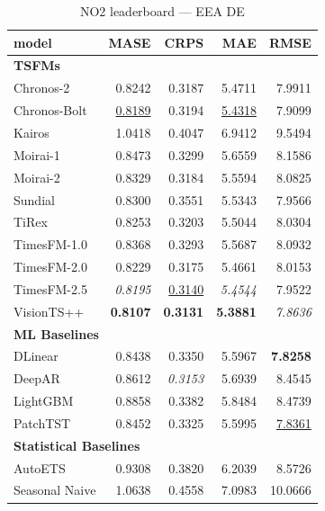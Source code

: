 \begin{table}[H]
\caption{NO2 leaderboard --- EEA DE}
\centering
\begin{small}
\begin{tabular}{lrrrr}
\toprule
model & MASE & CRPS & MAE & RMSE \\
\midrule
\multicolumn{5}{l}{\textbf{TSFMs}} \\
Chronos-2 & 0.8242 & 0.3187 & 5.4711 & 7.9911 \\
Chronos-Bolt & \underline{0.8189} & 0.3194 & \underline{5.4318} & 7.9099 \\
Kairos & 1.0418 & 0.4047 & 6.9412 & 9.5494 \\
Moirai-1 & 0.8473 & 0.3299 & 5.6559 & 8.1586 \\
Moirai-2 & 0.8329 & 0.3184 & 5.5594 & 8.0825 \\
Sundial & 0.8300 & 0.3551 & 5.5343 & 7.9566 \\
TiRex & 0.8253 & 0.3203 & 5.5044 & 8.0304 \\
TimesFM-1.0 & 0.8368 & 0.3293 & 5.5687 & 8.0932 \\
TimesFM-2.0 & 0.8229 & 0.3175 & 5.4661 & 8.0153 \\
TimesFM-2.5 & \textit{0.8195} & \underline{0.3140} & \textit{5.4544} & 7.9522 \\
VisionTS++ & \textbf{0.8107} & \textbf{0.3131} & \textbf{5.3881} & \textit{7.8636} \\
\midrule
\multicolumn{5}{l}{\textbf{ML Baselines}} \\
DLinear & 0.8438 & 0.3350 & 5.5967 & \textbf{7.8258} \\
DeepAR & 0.8612 & \textit{0.3153} & 5.6939 & 8.4545 \\
LightGBM & 0.8858 & 0.3382 & 5.8484 & 8.4739 \\
PatchTST & 0.8452 & 0.3325 & 5.5995 & \underline{7.8361} \\
\midrule
\multicolumn{5}{l}{\textbf{Statistical Baselines}} \\
AutoETS & 0.9308 & 0.3820 & 6.2039 & 8.5726 \\
Seasonal Naive & 1.0638 & 0.4558 & 7.0983 & 10.0666 \\
\bottomrule
\end{tabular}
\end{small}
\end{table}
